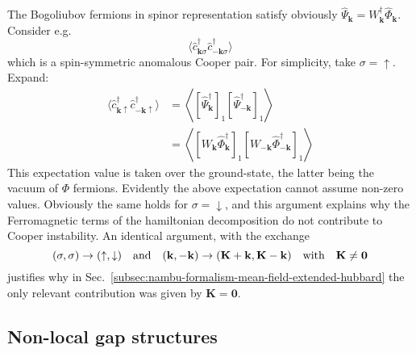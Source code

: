 The Bogoliubov fermions in spinor representation satisfy obviously $\hat \Psi_\mathbf{k} = W_\mathbf{k}^\dagger \hat \Phi_\mathbf{k}$. Consider e.g.
\[
	\langle
		\hat c_{\mathbf{k}\sigma}^\dagger
		\hat c_{-\mathbf{k}\sigma}^\dagger
	\rangle	
\]
which is a spin-symmetric anomalous Cooper pair. For simplicity, take $\sigma=\uparrow$. Expand:
\[
\begin{aligned}
	\langle
		\hat c_{\mathbf{k}\uparrow}^\dagger
		\hat c_{-\mathbf{k}\uparrow}^\dagger
	\rangle	&= \left\langle 
		[\hat \Psi_\mathbf{k}^\dagger]_1 [\hat \Psi_{-\mathbf{k}}^\dagger]_1 
	\right\rangle \\
	&= \left\langle 
		[W_\mathbf{k} \hat \Phi_\mathbf{k}^\dagger]_1 [W_{-\mathbf{k}} \hat \Phi_{-\mathbf{k}}^\dagger]_1 
	\right\rangle
\end{aligned}
\]
This expectation value is taken over the ground-state, the latter being the vacuum of $\Phi$ fermions. Evidently the above expectation cannot assume non-zero values. Obviously the same holds for $\sigma=\downarrow$, and this argument explains why the Ferromagnetic terms of the hamiltonian decomposition do not contribute to Cooper instability. An identical argument, with the exchange
\[
	(\sigma,\sigma) \to (\uparrow,\downarrow)
	\qq{and}
	(\mathbf{k},-\mathbf{k}) \to (\mathbf{K}+\mathbf{k},\mathbf{K}-\mathbf{k})
	\qq{with}
	\mathbf{K}\neq\mathbf{0}
\]
justifies why in Sec.~\ref{subsec:nambu-formalism-mean-field-extended-hubbard} the only relevant contribution was given by $\mathbf{K}=\mathbf{0}$.

\subsection{Non-local gap structures}

